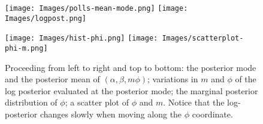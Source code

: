 \documentclass[11pt]{article}
\begin{document}
\begin{figure}
\label{fig:phi-mm}
\centering
\texttt{[image: Images/polls-mean-mode.png]}
\texttt{[image: Images/logpost.png]}

\texttt{[image: Images/hist-phi.png]}
\texttt{[image: Images/scatterplot-phi-m.png]}

\caption{Proceeding from left to right and top to bottom: the posterior mode and
  the posterior mean of $(\alpha, \beta, m \phi)$; variations in $m$ and $\phi$
  of the log posterior evaluated at the posterior mode; the marginal posterior
  distribution of $\phi$; a scatter plot of $\phi$ and $m$.  Notice that the
  log-posterior changes slowly when moving along the $\phi$ coordinate.}
\end{figure}


{}
\end{document}
